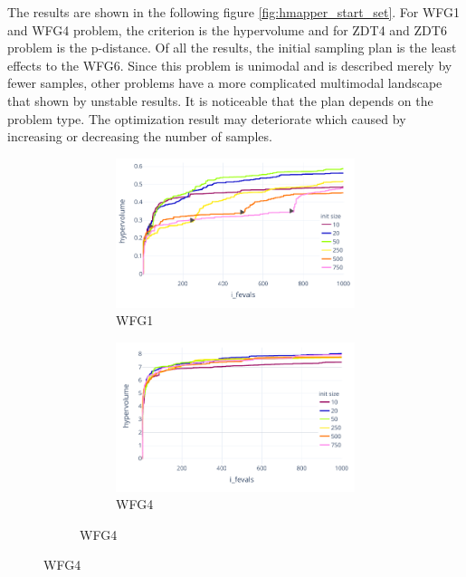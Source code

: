     The results are shown in the following figure \ref{fig:hmapper_start_set}. 
    For WFG1 and WFG4 problem, the criterion is the hypervolume and for ZDT4 and ZDT6 problem is the p-distance. Of all the results, the initial sampling plan is the least effects to the WFG6. Since this problem is unimodal and is described merely by fewer samples, other problems have a more complicated multimodal landscape that shown by unstable results. It is noticeable that the plan depends on the problem type. The optimization result may deteriorate which caused by increasing or decreasing the number of samples.

    \begin{figure}
        \centering
        \begin{subfigure}{\textwidth}
            \begin{subfigure}{0.45\textwidth}
                \includegraphics[width=\textwidth]{content/images/hypermapper_wfg1_start_set}
                \caption{WFG1}
                \label{fig:hmapper_wfg1_start_set}
            \end{subfigure}
            \begin{subfigure}{0.45\textwidth}
                \includegraphics[width=\textwidth]{content/images/hypermapper_wfg4_start_set}
                \caption{WFG4}
                \label{fig:hmapper_wfg4_start_set}
            \end{subfigure}
        \end{subfigure} 
        \hfill


\end{figure}
